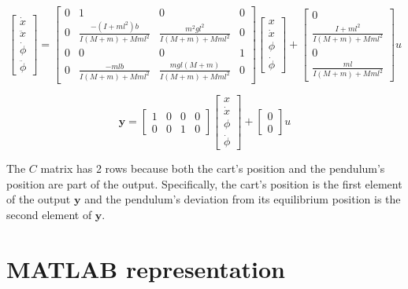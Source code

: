 \documentclass[12pt]{article}
\begin{document}
\begin{equation}
\begin{bmatrix}
  \dot{x}\\
  \ddot{x}\\
  \dot{\phi}\\
  \ddot{\phi}
\end{bmatrix}
=
\begin{bmatrix}
  0 & 1 & 0 & 0 \\
  0 & \tfrac{-(I+ml^2)b}{I(M+m)+Mml^2} & \tfrac{m^2gl^2}{I(M+m)+Mml^2} & 0 \\
  0 & 0 & 0 & 1 \\
  0 & \tfrac{-mlb}{I(M+m)+Mml^2} & \tfrac{mgl(M+m)}{I(M+m)+Mml^2} & 0
\end{bmatrix}
\begin{bmatrix}
  x \\
  \dot{x} \\
  \phi \\
  \dot{\phi}
\end{bmatrix}
+
\begin{bmatrix}
  0 \\
  \tfrac{I+ml^2}{I(M+m)+Mml^2} \\
  0 \\
  \tfrac{ml}{I(M+m)+Mml^2}
\end{bmatrix} u
\end{equation}

\begin{equation}
\mathbf{y} =
\begin{bmatrix}
  1 & 0 & 0 & 0 \\
  0 & 0 & 1 & 0
\end{bmatrix}
\begin{bmatrix}
  x \\
  \dot{x} \\
  \phi \\
  \dot{\phi}
\end{bmatrix}
+
\begin{bmatrix}
  0 \\
  0
\end{bmatrix} u
\end{equation}

The $C$ matrix has 2 rows because both the cart's position and the pendulum's position are part of the output. Specifically, the cart's position is the first element of the output $\mathbf{y}$ and the pendulum's deviation from its equilibrium position is the second element of $\mathbf{y}$.


\section{MATLAB representation}
\end{document}
